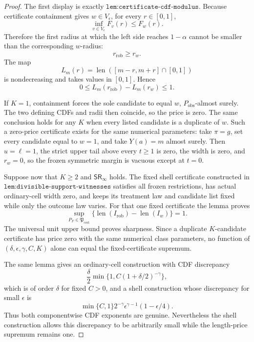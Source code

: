 \documentclass{article}
\begin{document}
\begin{proof}
The first display is exactly \(\texttt{lem:certificate-cdf-modulus}\). Because certificate containment gives \(w\in V_\epsilon\), for every \(r\in[0,1]\),
\[
\inf_{v\in V_\epsilon}F_v(r)\le F_w(r).
\]
Therefore the first radius at which the left side reaches \(1-\alpha\) cannot be smaller than the corresponding \(w\)-radius:
\[
r_{\mathrm{rob}}\ge r_w.
\]
The map
\[
L_m(r)=\operatorname{len}([m-r,m+r]\cap[0,1])
\]
is nondecreasing and takes values in \([0,1]\). Hence
\[
0\le L_m(r_{\mathrm{rob}})-L_m(r_w)\le1.
\]

If \(K=1\), containment forces the sole candidate to equal \(w\), \(P_{\mathrm{obs}}\)-almost surely. The two defining CDFs and radii then coincide, so the price is zero. The same conclusion holds for any \(K\) when every listed candidate is a duplicate of \(w\). Such a zero-price certificate exists for the same numerical parameters: take \(\pi=g\), set every candidate equal to \(w=1\), and take \(Y(a)=m\) almost surely. Then \(u=\ell=1\), the strict upper tail above every \(t\ge1\) is zero, the width is zero, and \(r_w=0\), so the frozen symmetric margin is vacuous except at \(t=0\).

Suppose now that \(K\ge2\) and \(\mathsf{SR}_\infty\) holds. The fixed shell certificate constructed in \(\texttt{lem:divisible-support-witnesses}\) satisfies all frozen restrictions, has actual ordinary-cell width zero, and keeps its treatment law and candidate list fixed while only the outcome law varies. For that one fixed certificate the lemma proves
\[
\sup_{P_F\in\mathfrak P_{\mathrm{cert}}}
\{\operatorname{len}(I_{\mathrm{rob}})
-\operatorname{len}(I_w)\}=1.
\]
The universal unit upper bound proves sharpness. Since a duplicate \(K\)-candidate certificate has price zero with the same numerical class parameters, no function of \((\delta,\epsilon,\gamma,C,K)\) alone can equal the fixed-certificate supremum.

The same lemma gives an ordinary-cell construction with CDF discrepancy
\[
\frac{\delta}{2}
 \min\{1,C(1+\delta/2)^{-\gamma}\},
\]
which is of order \(\delta\) for fixed \(C>0\), and a shell construction whose discrepancy for small \(\epsilon\) is
\[
\min\{C,1\}2^{-\gamma}\epsilon^{\gamma-1}(1-\epsilon/4).
\]
Thus both componentwise CDF exponents are genuine. Nevertheless the shell construction allows this discrepancy to be arbitrarily small while the length-price supremum remains one.


\end{proof}
\end{document}

